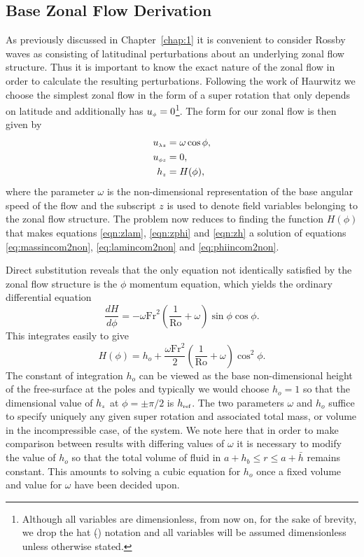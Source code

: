 \subsection{Base Zonal Flow Derivation} \label{sec:incompbase}
As previously discussed in Chapter~\ref{chap:1} it is convenient to consider Rossby waves as consisting of latitudinal perturbations about an underlying zonal flow structure. Thus it is important to know the exact nature of the zonal flow in order to calculate the resulting perturbations. Following the work of Haurwitz\cite[page 255]{Haurwitz:MAD} we choose the simplest zonal flow in the form of a super rotation that only depends on latitude and additionally has ${u_{\scriptscriptstyle \phi}}=0$\footnote{Although all variables are dimensionless, from now on, for the sake of brevity, we drop the hat ($\hat{}$) notation and all variables will be assumed dimensionless unless otherwise stated.}. The form for our zonal flow is then given by
\begin{align}
{\ensuremath{u_{\scriptscriptstyle \lambda z}}} &= \omega\cos\phi, \label{eqn:zlam}\\
{u_{\scriptscriptstyle \phi z}} &= 0,\label{eqn:zphi}\\
{h_{\scriptscriptstyle z}} &= H(\phi), \label{eqn:zh}
\end{align}
where the parameter $\omega$ is the non-dimensional representation of the base angular speed of the flow and the subscript $z$ is used to denote field variables belonging to the zonal flow structure. The problem now reduces to finding the function $H(\phi)$ that makes equations \eqref{eqn:zlam}, \eqref{eqn:zphi} and \eqref{eqn:zh} a solution of equations \eqref{eq:massincom2non}, \eqref{eq:lamincom2non} and \eqref{eq:phiincom2non}. 

Direct substitution reveals that the only equation not identically satisfied by the zonal flow structure is the $\phi$ momentum equation, which yields the ordinary differential equation
\begin{equation}
\frac{d H}{d \phi} = -\omega \mathrm{Fr}^2 \left(\frac{1}{\mathrm{Ro}}+\omega \right)\sin\phi\cos\phi. 
\end{equation}
This integrates easily to give
\begin{equation}
H(\phi) = h_o + \frac{\omega \mathrm{Fr}^2}{2}\left(\frac{1}{\mathrm{Ro}}+\omega \right)\cos^2\!\phi.
\end{equation}
The constant of integration $h_o$ can be viewed as the base non-dimensional height of the free-surface at the poles and typically we would choose $h_o=1$ so that the dimensional value of ${h_{\scriptscriptstyle z}}$ at $\phi=\pm \pi/2$ is $h_{\mbox{\tiny ref}}$. The two parameters $\omega$ and $h_o$ suffice to  specify uniquely any given super rotation and associated total mass, or volume in the incompressible case, of the system. We note here that in order to make comparison between results with differing values of $\omega$ it is necessary to modify the value of $h_o$ so that the total volume of fluid in $a+h_b \le r \le a+\bar{h}$ remains constant. This amounts to solving a cubic equation for $h_o$ once a fixed volume and value for $\omega$ have been decided upon.

